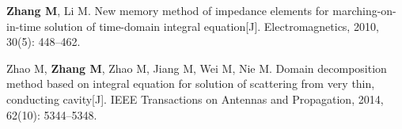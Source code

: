 \uestcachievements


{\small
\begin{enumerate}[
    label={\textup{[\arabic*]}},
    labelwidth=2em,
    labelsep=.5em,
    leftmargin=2.5em,
    align=left,
    topsep=0pt,
    partopsep=0pt,
    itemsep=0pt,
    parsep=0pt
]
    \item \textbf{Zhang M}, Li M. New memory method of impedance elements for marching-on-in-time solution of time-domain integral equation[J]. Electromagnetics, 2010, 30(5): 448--462.
    \item Zhao M, \textbf{Zhang M}, Zhao M, Jiang M, Wei M, Nie M. Domain decomposition method based on integral equation for solution of scattering from very thin, conducting cavity[J]. IEEE Transactions on Antennas and Propagation, 2014, 62(10): 5344--5348.
\end{enumerate}
}
